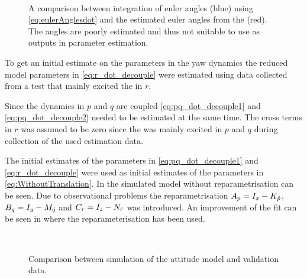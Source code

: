 \begin{figure}[tbp]
  \centering
  \qquad
  \\
  \caption{\label{fig:integratedAngleVelocities}%
  A comparison between integration of euler angles (blue) using \eqref{eq:eulerAnglesdot} and the estimated euler angles from the \abbrEKF (red). The angles are poorly estimated and thus not suitable to use as outputs in parameter estimation.}
\end{figure}

To get an initial estimate on the parameters in the yaw dynamics the reduced model parameters in \eqref{eq:r_dot_decouple}
were estimated using data collected from a test that mainly excited the \abbrROV in $r$.

Since the dynamics in $p$ and $q$ are coupled \eqref{eq:pq_dot_decouple1} and \eqref{eq:pq_dot_decouple2} needed to be estimated at the same time. The cross terms in $r$ was assumed to be zero since the \abbrROV was mainly excited in $p$ and $q$ during collection of the used estimation data. 

The initial estimates of the parameters in \eqref{eq:pq_dot_decouple1} and \eqref{eq:r_dot_decouple} were used as initial estimates of the parameters in \eqref{eq:WithoutTranslation}. In  the simulated model without reparametrisation can be seen. Due to observational problems the reparametrisation $A_p = I_{x} - K_{\dot{p}}$, $B_q = I_{y} - M_{\dot{q}}$ and $C_r = I_{z} - N_{\dot{r}}$ was introduced.  An improvement of the fit can be seen in  where the reparameterisation has been used.
\begin{figure}[tbp]
  \centering
  \qquad
  \\
  \caption{\label{fig:velocityCompare}%
    Comparison between simulation of the attitude model and validation data.}
\end{figure}


